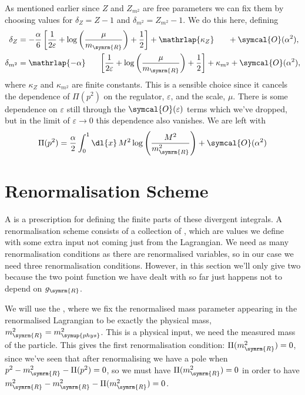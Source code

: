 \documentclass[fleqn]{NotesClass}
\newcommand{\order}{\symcal{O}}
\newcommand{\phys}{\symup{phys}}
\newcommand{\renormalised}{\symrm{R}}
\begin{document}
    As mentioned earlier since \(Z\) and \(Z_{m^2}\) are free parameters we can fix them by choosing values for \(\delta_Z = Z - 1\) and \(\delta_{m^2} = Z_{m^2} - 1\).
    We do this here, defining
    \begin{align}
        \delta_Z &= -\frac{\alpha}{6}\left[ \frac{1}{2\varepsilon} + \log\left( \frac{\mu}{m_{\renormalised}} \right) + \frac{1}{2} \right] + \mathrlap{\kappa_{Z}}\hphantom{\kappa_{m^2}} + \order(\alpha^2),\\
        \delta_{m^2} &= \mathrlap{-\alpha}\hphantom{-\frac{\alpha}{6}}\left[ \frac{1}{2\varepsilon} + \log\left( \frac{\mu}{m_{\renormalised}} \right) + \frac{1}{2} \right] + \kappa_{m^2} + \order(\alpha^2),
    \end{align}
    where \(\kappa_Z\) and \(\kappa_{m^2}\) are finite constants.
    This is a sensible choice since it cancels the dependence of \(\Pi(p^2)\) on the regulator, \(\varepsilon\), and the scale, \(\mu\).
    There is some dependence on \(\varepsilon\) still through the \(\order(\varepsilon)\) terms which we've dropped, but in the limit of \(\varepsilon \to 0\) this dependence also vanishes.
    We are left with
    \begin{equation}
        \Pi(p^2) = \frac{\alpha}{2} \int_0^1 \dl{x} \, M^2 \log\left( \frac{M^2}{m_{\renormalised}^2} \right) + \order(\alpha^2)
    \end{equation}
    
    \section{Renormalisation Scheme}
    A  is a prescription for defining the finite parts of these divergent integrals.
    A renormalisation scheme consists of a collection of , which are values we define with some extra input not coming just from the Lagrangian.
    We need as many renormalisation conditions as there are renormalised variables, so in our case we need three renormalisation conditions.
    However, in this section we'll only give two because the two point function we have dealt with so far just happens not to depend on \(g_{\renormalised}\).
    
    We will use the , where we fix the renormalised mass parameter appearing in the renormalised Lagrangian to be exactly the physical mass, \(m_{\renormalised}^2 = m_{\phys}^2\).
    This is a physical input, we need the measured mass of the particle.
    This gives the first renormalisation condition: \(\Pi(m_{\renormalised}^2) = 0\), since we've seen that after renormalising we have a pole when \(p^2 - m_{\renormalised}^2 - \Pi(p^2) = 0\), so we must have \(\Pi(m_{\renormalised}^2) = 0\) in order to have \(m_{\renormalised}^2 - m_{\renormalised}^2 - \Pi(m_{\renormalised}^2) = 0\).
    
\end{document}
